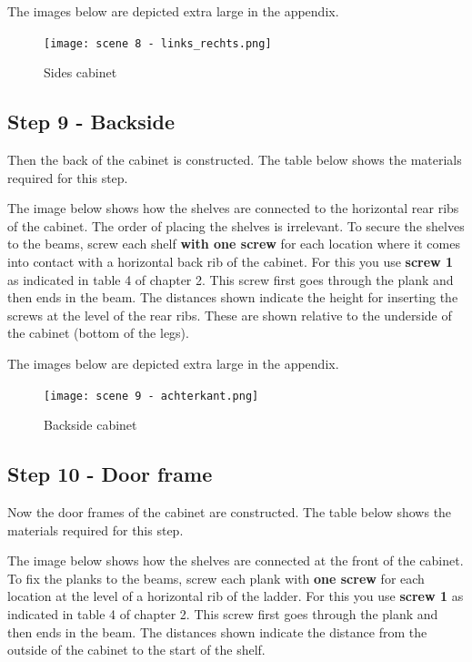 \documentclass{article}
\begin{document}
The images below are depicted extra large in the appendix.

\begin{figure}[h!]
    \centering
    \texttt{[image: scene 8 - links\_rechts.png]}
    \caption{Sides cabinet}
    \label{fig:stap 8}
\end{figure}

\clearpage
\newpage

\subsection{Step 9 - Backside}

Then the back of the cabinet is constructed. The table below shows the materials required for this step.



The image below shows how the shelves are connected to the horizontal rear ribs of the cabinet. The order of placing the shelves is irrelevant. To secure the shelves to the beams, screw each shelf \textbf{with one screw} for each location where it comes into contact with a horizontal back rib of the cabinet. For this you use \textbf{screw 1} as indicated in table 4 of chapter 2. This screw first goes through the plank and then ends in the beam. The distances shown indicate the height for inserting the screws at the level of the rear ribs. These are shown relative to the underside of the cabinet (bottom of the legs).

The images below are depicted extra large in the appendix.

\begin{figure}[h!]
    \centering
    \texttt{[image: scene 9 - achterkant.png]}
    \caption{Backside cabinet}
    \label{fig:stap 9}
\end{figure}

\clearpage
\newpage

\subsection{Step 10 - Door frame}

Now the door frames of the cabinet are constructed. The table below shows the materials required for this step.



The image below shows how the shelves are connected at the front of the cabinet. To fix the planks to the beams, screw each plank with \textbf{one screw} for each location at the level of a horizontal rib of the ladder. For this you use \textbf{screw 1} as indicated in table 4 of chapter 2. This screw first goes through the plank and then ends in the beam. The distances shown indicate the distance from the outside of the cabinet to the start of the shelf.
\end{document}

